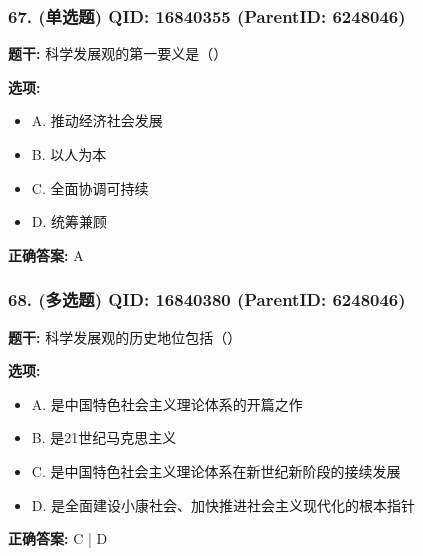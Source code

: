 \documentclass[12pt,UTF8]{ctexart}
\begin{document}
\subsubsection*{67. (单选题) \small QID: 16840355 (ParentID: 6248046)}

\textbf{题干:}
科学发展观的第一要义是（）



\textbf{选项:}
\begin{itemize}[leftmargin=*]

  \item A. 推动经济社会发展

  \item B. 以人为本

  \item C. 全面协调可持续

  \item D. 统筹兼顾

\end{itemize}

\textbf{正确答案:}
A

\vspace{0.3em}\hrulefill\vspace{0.7em}

\subsubsection*{68. (多选题) \small QID: 16840380 (ParentID: 6248046)}

\textbf{题干:}
科学发展观的历史地位包括（）



\textbf{选项:}
\begin{itemize}[leftmargin=*]

  \item A. 是中国特色社会主义理论体系的开篇之作

  \item B. 是21世纪马克思主义

  \item C. 是中国特色社会主义理论体系在新世纪新阶段的接续发展

  \item D. 是全面建设小康社会、加快推进社会主义现代化的根本指针

\end{itemize}

\textbf{正确答案:}
C | D

\vspace{0.3em}\hrulefill\vspace{0.7em}
\end{document}

